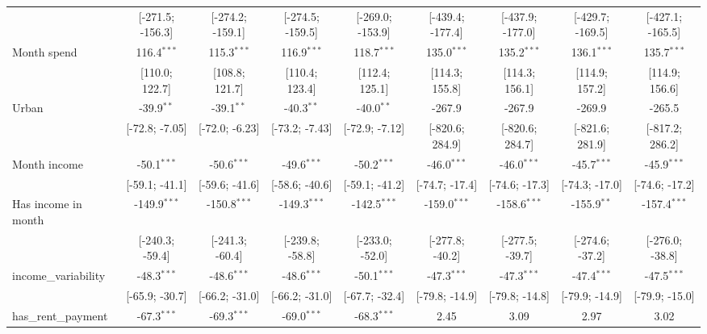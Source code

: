\begin{table}[htbp]
\begin{threeparttable}[b]
\begin{tabular}{lcccccccc}
                                  & [-271.5; -156.3] & [-274.2; -159.1] & [-274.5; -159.5] & [-269.0; -153.9] & [-439.4; -177.4] & [-437.9; -177.0] & [-429.7; -169.5] & [-427.1; -165.5]\\   
         Month spend              & 116.4$^{***}$    & 115.3$^{***}$    & 116.9$^{***}$    & 118.7$^{***}$    & 135.0$^{***}$    & 135.2$^{***}$    & 136.1$^{***}$    & 135.7$^{***}$\\   
                                  & [110.0; 122.7]   & [108.8; 121.7]   & [110.4; 123.4]   & [112.4; 125.1]   & [114.3; 155.8]   & [114.3; 156.1]   & [114.9; 157.2]   & [114.9; 156.6]\\   
         Urban                    & -39.9$^{**}$     & -39.1$^{**}$     & -40.3$^{**}$     & -40.0$^{**}$     & -267.9           & -267.9           & -269.9           & -265.5\\   
                                  & [-72.8; -7.05]   & [-72.0; -6.23]   & [-73.2; -7.43]   & [-72.9; -7.12]   & [-820.6; 284.9]  & [-820.6; 284.7]  & [-821.6; 281.9]  & [-817.2; 286.2]\\   
         Month income             & -50.1$^{***}$    & -50.6$^{***}$    & -49.6$^{***}$    & -50.2$^{***}$    & -46.0$^{***}$    & -46.0$^{***}$    & -45.7$^{***}$    & -45.9$^{***}$\\   
                                  & [-59.1; -41.1]   & [-59.6; -41.6]   & [-58.6; -40.6]   & [-59.1; -41.2]   & [-74.7; -17.4]   & [-74.6; -17.3]   & [-74.3; -17.0]   & [-74.6; -17.2]\\   
         Has income in month      & -149.9$^{***}$   & -150.8$^{***}$   & -149.3$^{***}$   & -142.5$^{***}$   & -159.0$^{***}$   & -158.6$^{***}$   & -155.9$^{**}$    & -157.4$^{***}$\\   
                                  & [-240.3; -59.4]  & [-241.3; -60.4]  & [-239.8; -58.8]  & [-233.0; -52.0]  & [-277.8; -40.2]  & [-277.5; -39.7]  & [-274.6; -37.2]  & [-276.0; -38.8]\\   
         income\_variability      & -48.3$^{***}$    & -48.6$^{***}$    & -48.6$^{***}$    & -50.1$^{***}$    & -47.3$^{***}$    & -47.3$^{***}$    & -47.4$^{***}$    & -47.5$^{***}$\\   
                                  & [-65.9; -30.7]   & [-66.2; -31.0]   & [-66.2; -31.0]   & [-67.7; -32.4]   & [-79.8; -14.9]   & [-79.8; -14.8]   & [-79.9; -14.9]   & [-79.9; -15.0]\\   
         has\_rent\_payment       & -67.3$^{***}$    & -69.3$^{***}$    & -69.0$^{***}$    & -68.3$^{***}$    & 2.45             & 3.09             & 2.97             & 3.02\\   

\end{tabular}
\end{threeparttable}
\end{table}
